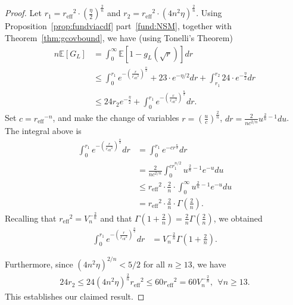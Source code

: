 \documentclass[article,doublecolumn]{IEEEtran}
\newcommand{\EE}{{\mathbb{E}}}
\newcommand{\reff}{{r_{\mathrm{eff}}}}
\newcommand{\VcdfL}{g_L}
\begin{document}
\begin{proof}
Let $r_1=\reff^2 \cdot\left(\frac{\eta}{2}\right)^{\frac{2}{n}}$ and $r_2=\reff^2 \cdot\left(4n^2\eta \right)^{\frac{2}{n}}$. 
Using Proposition~\ref{prop:fundviacdf} part~\ref{fund:NSM}, together with Theorem~\ref{thm:gcovbound}, we have (using Tonelli's Theorem)
\begin{align}
n\EE[G_L]&=\int_{0}^{\infty}\EE[1-\VcdfL(\sqrt{r})]dr\\
&\leq \int_{0}^{r_1} e^{-\left(\frac{r}{\reff^2}\right)^{\frac{n}{2}}}+ 23 \cdot e^{-\eta/2}dr +\int_{r_1}^{r_2}  24 \cdot e^{-\frac{\eta}{2}}dr\\
&\leq 24 r_2 e^{-\frac{\eta}{2}}+\int_{0}^{r_1} e^{-\left(\frac{r}{\reff^2}\right)^{\frac{n}{2}}}dr.
\end{align}
Set $c=\reff^{-n}$, and make the change of variables $r=\left(\frac{u}{c}\right)^{\frac{2}{n}}$, $dr=\frac{2}{n c^{2/n}}u^{\frac{2}{n}-1}du$. The integral above is
\begin{align}
\int_{0}^{r_1} e^{-\left(\frac{r}{\reff^2}\right)^{\frac{n}{2}}}dr&=\int_{0}^{r_1} e^{-cr^{\frac{n}{2}}}dr\\
&=\frac{2}{n c^{2/n}}\int_{0}^{c r_1^{n/2}} u^{\frac{2}{n}-1}e^{-u}du\\
&\leq \reff^2\cdot \frac{2}{n}\cdot
 \int_{0}^{\infty} u^{\frac{2}{n}-1}e^{-u}du\\
&=\reff^2\cdot \frac{2}{n}\cdot \Gamma\left(\frac{2}{n}\right).
\end{align}
Recalling that $\reff^2=V_n^{-\frac{2}{n}}$ and that $\Gamma(1+\frac{2}{n})=\frac{2}{n}\Gamma(\frac{2}{n})$, we obtained
\begin{align}
\int_{0}^{r_1} e^{-\left(\frac{r}{\reff^2}\right)^{\frac{n}{2}}}dr&= V_n^{-\frac{2}{n}}\Gamma\left(1+\frac{2}{n}\right).
\end{align}

Furthermore, since $(4n^2\eta)^{2/n}<5/2$ for all $n\geq 13$, we have
\begin{align}
24 r_2\leq 24 \left(4 n^2 \eta \right)^{\frac{2}{n}}\reff^2\leq 60 \reff^2=60V_n^{-\frac{2}{n}} ,~~\forall n\geq 13.
\end{align}
This establishes our claimed result.
\end{proof}
\end{document}
